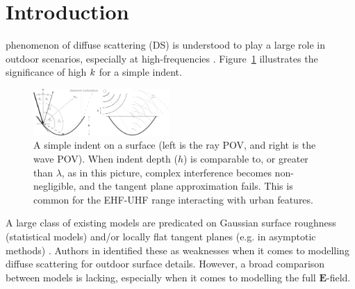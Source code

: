 \documentclass[lettersize,journal]{IEEEtran}
\DeclareRobustCommand{\eFreq}{\mathbf{E}}
\begin{document}
\section{Introduction}
 phenomenon of diffuse scattering (DS) is understood to play a
large role in outdoor scenarios, especially at high-frequencies \cite{ref:ER1}.
Figure~\ref{fig:kirchhoff-limit} illustrates the significance of high $k$ for
a simple indent.

\begin{figure}[!b]
   \begin{center}
      \includegraphics[width=0.46\textwidth]{../figures/kirchhoff-approx-crop.pdf}
   \end{center}
   \caption{A simple indent on a surface (left is the ray POV,  and right is the wave
   POV). When indent depth ($h$) is comparable to, or greater than $\lambda$, as in
   this picture, complex interference becomes non-negligible, and the tangent plane
   approximation fails. This is common for the EHF-UHF range interacting with urban
   features.}\label{fig:kirchhoff-limit}
\end{figure}

A large class of existing models are predicated on Gaussian surface roughness
(statistical models) and/or locally flat tangent planes (e.g. in asymptotic methods)
. Authors in \cite{ref:ER2} identified these as weaknesses when it comes to modelling
diffuse scattering for outdoor surface details. However, a broad comparison between
models is lacking, especially when it comes to modelling the full $\eFreq$-field.
\end{document}
